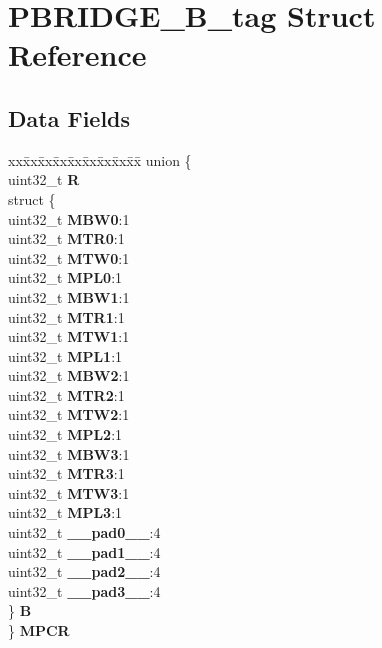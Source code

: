 \hypertarget{structPBRIDGE__B__tag}{}\section{P\+B\+R\+I\+D\+G\+E\+\_\+\+B\+\_\+tag Struct Reference}
\label{structPBRIDGE__B__tag}
\subsection*{Data Fields}
\begin{DoxyCompactItemize}
\item 
\mbox{\label{structPBRIDGE__B__tag_ac16393502b635d6657c4e57e5053aeb6}} 
\begin{tabbing}
xx\=xx\=xx\=xx\=xx\=xx\=xx\=xx\=xx\=\kill
union \{\\
\>uint32\_t {\bfseries R}\\
\>struct \{\\
\>\>uint32\_t {\bfseries MBW0}:1\\
\>\>uint32\_t {\bfseries MTR0}:1\\
\>\>uint32\_t {\bfseries MTW0}:1\\
\>\>uint32\_t {\bfseries MPL0}:1\\
\>\>uint32\_t {\bfseries MBW1}:1\\
\>\>uint32\_t {\bfseries MTR1}:1\\
\>\>uint32\_t {\bfseries MTW1}:1\\
\>\>uint32\_t {\bfseries MPL1}:1\\
\>\>uint32\_t {\bfseries MBW2}:1\\
\>\>uint32\_t {\bfseries MTR2}:1\\
\>\>uint32\_t {\bfseries MTW2}:1\\
\>\>uint32\_t {\bfseries MPL2}:1\\
\>\>uint32\_t {\bfseries MBW3}:1\\
\>\>uint32\_t {\bfseries MTR3}:1\\
\>\>uint32\_t {\bfseries MTW3}:1\\
\>\>uint32\_t {\bfseries MPL3}:1\\
\>\>uint32\_t {\bfseries \_\_pad0\_\_}:4\\
\>\>uint32\_t {\bfseries \_\_pad1\_\_}:4\\
\>\>uint32\_t {\bfseries \_\_pad2\_\_}:4\\
\>\>uint32\_t {\bfseries \_\_pad3\_\_}:4\\
\>\} {\bfseries B}\\
\} {\bfseries MPCR}\\


\end{tabbing}
\end{DoxyCompactItemize}
